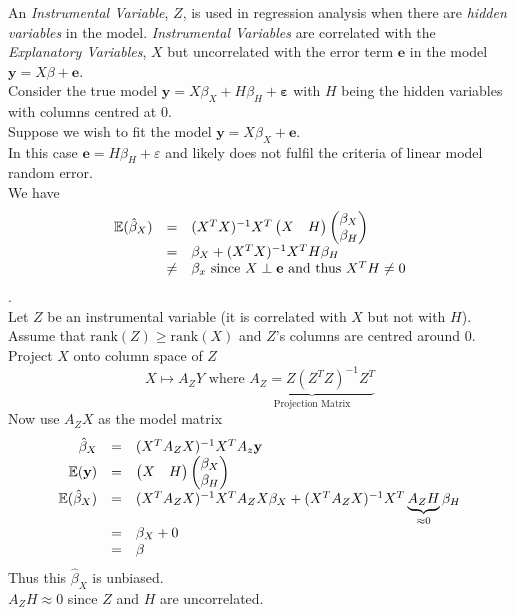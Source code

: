 \documentclass[11pt,a4paper]{article}
\begin{document}
An \textit{Instrumental Variable}, $Z$, is used in regression analysis when there are \textit{hidden variables} in the model. \textit{Instrumental Variables} are correlated with the \textit{Explanatory Variables}, $X$ but uncorrelated with the error term $\textbf{e}$ in the model $\textbf{y}=X\beta+\textbf{e}$.\\

Consider the true model $\textbf{y}=X\beta_X+H\beta_H+\pmb\varepsilon$ with $H$ being the hidden variables with columns centred at 0.\\
Suppose we wish to fit the model $\textbf{y}=X\beta_X+\textbf{e}$.\\
In this case $\textbf{e}=H\beta_H+\varepsilon$ and likely does not fulfil the criteria of linear model random error.\\
We have
\[\begin{array}{rcl}
\mathbb{E}(\hat\beta_X)&=&(X^TX)^{-1}X^T\begin{pmatrix}X&H\end{pmatrix}\begin{pmatrix}\beta_X\\\beta_H\end{pmatrix}\\
&=&\beta_X+(X^TX)^{-1}X^TH\beta_H\\
&\neq&\beta_x\text{ since }X\perp\textbf{e}\text{ and thus }X^TH\neq0
\end{array}\].\\

Let $Z$ be an instrumental variable (\ie it is correlated with $X$ but not with $H$).\\
Assume that $\text{rank}(Z)\geq\text{rank}(X)$ and $Z$'s columns are centred around 0.\\
Project $X$ onto column space of $Z$
$$X\mapsto A_ZY\text{ where }\underbrace{A_Z=Z(Z^TZ)^{-1}Z^T}_\text{Projection Matrix}$$
Now use $A_ZX$ as the model matrix
\[\begin{array}{rcl}
\hat\beta_X&=&(X^TA_ZX)^{-1}X^TA_z\textbf{y}\\
\mathbb{E}(\textbf{y})&=&\begin{pmatrix}X&H\end{pmatrix}\begin{pmatrix}\beta_X\\\beta_H\end{pmatrix}\\
\mathbb{E}(\hat\beta_X)&=&(X^TA_ZX)^{-1}X^TA_ZX\beta_X+(X^TA_ZX)^{-1}X^T\underbrace{A_ZH}_{\approx0}\beta_H\\
&=&\beta_X+0\\
&=&\beta
\end{array}\]
Thus this $\hat\beta_X$ is unbiased.\\
\nb $A_ZH\approx0$ since $Z$ and $H$ are uncorrelated.
\end{document}
